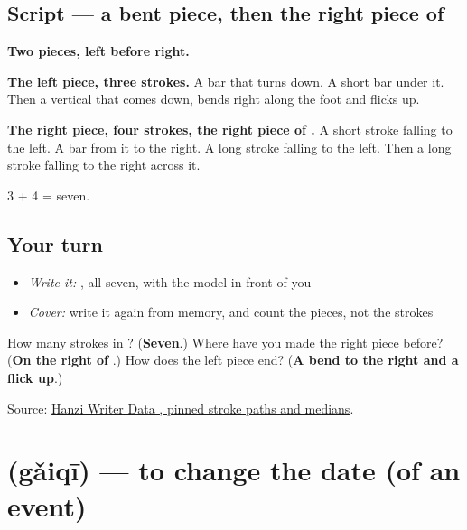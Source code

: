 \subsection*{Script — a bent piece, then the right piece of }

\begin{quote}
\end{quote}

\textbf{Two pieces, left before right.}

\textbf{The left piece, three strokes.} A bar that turns down. A short bar under it. Then a vertical that comes down, bends right along the foot and flicks up.

\textbf{The right piece, four strokes, the right piece of .} A short stroke falling to the left. A bar from it to the right. A long stroke falling to the left. Then a long stroke falling to the right across it.

3 + 4 = seven.

\subsection*{Your turn}
\begin{itemize}
\raggedright
  \item \emph{Write it:} , all seven, with the model in front of you
  \item \emph{Cover:} write it again from memory, and count the pieces, not the strokes
\end{itemize}

\begin{tcolorbox}[breakable,colback=teal!4,colframe=teal!35!black,title={Before you move on}]
How many strokes in ? (\textbf{Seven}.) Where have you made the right piece before? (\textbf{On the right of }.) How does the left piece end? (\textbf{A bend to the right and a flick up}.)

Source: \href{https://raw.githubusercontent.com/chanind/hanzi-writer-data/68d10a4b21150cae5e1ebbd223eed289cf32d90c/data/\%E6\%94\%B9.json}{Hanzi Writer Data , pinned stroke paths and medians}.
\end{tcolorbox}
\section[\texorpdfstring{\zh{改期} (gǎiqī)}{改期 (gǎiqī)}]{ (gǎiqī) — to change the date (of an event)}

